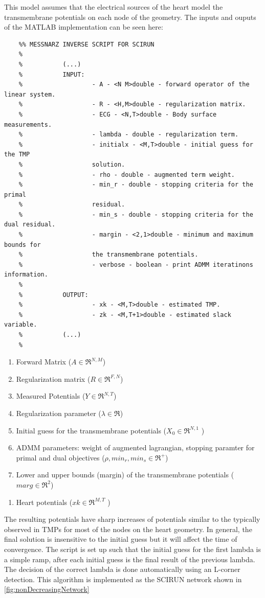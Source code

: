     This model assumes that the electrical sources of the heart model the transmembrane potentials on each node of the geometry. The inputs and ouputs of the MATLAB implementation can be seen here:
    \begin{verbatim}
    %% MESSNARZ INVERSE SCRIPT FOR SCIRUN
    %
    %           (...)
    %			INPUT:
    % 					- A - <N M>double - forward operator of the linear system.
    % 					- R - <H,M>double - regularization matrix.
    % 					- ECG - <N,T>double - Body surface measurements.
    % 					- lambda - double - regularization term.
    % 					- initialx - <M,T>double - initial guess for the TMP
    % 					solution.
    % 					- rho - double - augmented term weight.
    % 					- min_r - double - stopping criteria for the primal
    % 					residual.
    % 					- min_s - double - stopping criteria for the dual residual.
    %					- margin - <2,1>double - minimum and maximum bounds for
    %					the transmembrane potentials.
    % 					- verbose - boolean - print ADMM iteratinons information.
    %
    %			OUTPUT:
    % 					- xk - <M,T>double - estimated TMP.
    % 					- zk - <M,T+1>double - estimated slack variable.
    %           (...)
    %
    \end{verbatim}
    \begin{enumerate}
        \item Forward Matrix ($A\in\Re^{N,M}$)
        \item Regularization matrix ($R\in\Re^{F,N}$)
        \item Measured Potentials ($Y\in\Re^{N,T}$)
        \item Regularization parameter ($\lambda\in\Re$)
        \item Initial guess for the transmembrane potentials ($X_0\in\Re^{N,1}$ )
        \item ADMM parameters: weight of augmented lagrangian, stopping paramter for primal and dual objectives ($\rho, min_r, min_s \in\Re^{+}$)
        \item Lower and upper bounds (margin) of the transmembrane potentials ($marg\in\Re^2$)
    \end{enumerate}

    \begin{enumerate}
        \item Heart potentials ($xk\in\Re^{M,T}$ )
    \end{enumerate}

    The resulting potentials have sharp increases of potentials similar to the typically observed in TMPs for most of the nodes on the heart geometry.
    In general, the final solution is insensitive to the initial guess but it will affect the time of convergence.
    The script is set up such that the initial guess for the first lambda is a simple ramp, after each initial guess is the final result of the previous lambda.
    The decision of the correct lambda is done automatically using an L-corner detection.
    This algorithm is implemented as the SCIRUN network shown in \autoref{fig:nonDecreasingNetwork}

